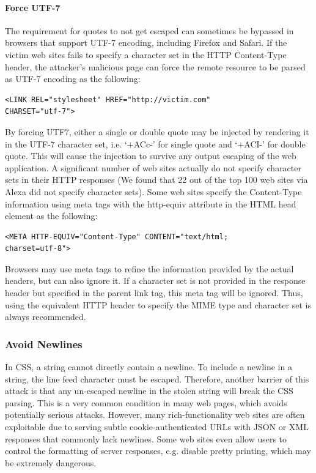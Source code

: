 \documentclass{acm_proc_article-sp}
\begin{document}
{\paragraph{Force UTF-7}
The requirement for quotes to not get escaped can sometimes be bypassed in browsers that support UTF-7 encoding, including Firefox and Safari. If the victim web sites fails to specify a character set in the HTTP  Content-Type header, the attacker's malicious page can force the remote resource to be parsed as UTF-7 encoding as the following:
\begin{verbatim}
<LINK REL="stylesheet" HREF="http://victim.com" 
CHARSET="utf-7">
\end{verbatim}
By forcing UTF7, either a single or double quote may be injected by rendering it in the UTF-7 character set, i.e. `+ACc-' for single quote and `+ACI-' for double quote. This will cause the injection to survive any output escaping of the web application. A significant number of web sites actually do not specify character sets in their HTTP responses (We found that 22 out of the top 100 web sites via Alexa\cite{alexa} did not specify character sets). Some web sites specify the Content-Type information using meta tags with the http-equiv attribute in the HTML head element as the following:
\begin{verbatim}
<META HTTP-EQUIV="Content-Type" CONTENT="text/html; 
charset=utf-8">
\end{verbatim}
Browsers may use meta tags to refine the information provided by the actual headers, but can also ignore it. If a character set is not provided in the response header but specified in the parent link tag, this meta tag will be ignored. Thus, using the equivalent HTTP header to specify the MIME type and character set is always recommended.

\subsubsection{Avoid Newlines}
In CSS, a string cannot directly contain a newline. To include a newline in a string, the line feed character must be escaped. Therefore, another barrier of this attack is that any un-escaped newline in the stolen string will break the CSS parsing. This is a very common condition in many web pages, which avoids potentially serious attacks. However, many rich-functionality web sites are often exploitable due to serving subtle cookie-authenticated URLs with JSON or XML responses that commonly lack newlines. Some web sites even allow users to control the formatting of server responses, e.g. disable pretty printing, which may be extremely dangerous.
}
\end{document}
